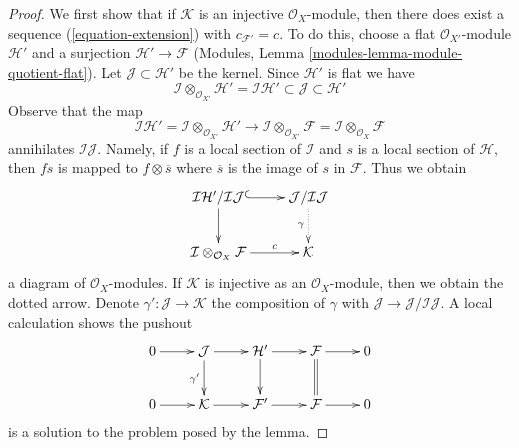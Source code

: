 \documentclass{stacks-project}
\theoremstyle{plain}
\theoremstyle{definition}
\theoremstyle{remark}
\numberwithin{equation}{subsection}
\begin{document}
\begin{proof}
We first show that if $\mathcal{K}$ is an injective $\mathcal{O}_X$-module,
then there does exist a sequence (\ref{equation-extension}) with
$c_{\mathcal{F}'} = c$. To do this, choose a flat
$\mathcal{O}_{X'}$-module $\mathcal{H}'$ and a surjection
$\mathcal{H}' \to \mathcal{F}$
(Modules, Lemma \ref{modules-lemma-module-quotient-flat}).
Let $\mathcal{J} \subset \mathcal{H}'$ be the kernel. Since $\mathcal{H}'$
is flat we have
$$
\mathcal{I} \otimes_{\mathcal{O}_{X'}} \mathcal{H}' =
\mathcal{I}\mathcal{H}'
\subset \mathcal{J} \subset \mathcal{H}'
$$
Observe that the map
$$
\mathcal{I}\mathcal{H}' =
\mathcal{I} \otimes_{\mathcal{O}_{X'}} \mathcal{H}'
\longrightarrow
\mathcal{I} \otimes_{\mathcal{O}_{X'}} \mathcal{F} =
\mathcal{I} \otimes_{\mathcal{O}_X} \mathcal{F}
$$
annihilates $\mathcal{I}\mathcal{J}$. Namely, if $f$ is a local section
of $\mathcal{I}$ and $s$ is a local section of $\mathcal{H}$, then
$fs$ is mapped to $f \otimes \overline{s}$ where $\overline{s}$ is
the image of $s$ in $\mathcal{F}$. Thus we obtain
$$
\xymatrix{
\mathcal{I}\mathcal{H}'/\mathcal{I}\mathcal{J}
\ar@{^{(}->}[r] \ar[d] &
\mathcal{J}/\mathcal{I}\mathcal{J} \ar@{..>}[d]_\gamma \\
\mathcal{I} \otimes_{\mathcal{O}_X} \mathcal{F} \ar[r]^-c &
\mathcal{K}
}
$$
a diagram of $\mathcal{O}_X$-modules. If $\mathcal{K}$ is injective
as an $\mathcal{O}_X$-module, then we obtain the dotted arrow.
Denote $\gamma' : \mathcal{J} \to \mathcal{K}$ the composition
of $\gamma$ with $\mathcal{J} \to \mathcal{J}/\mathcal{I}\mathcal{J}$.
A local calculation shows the pushout
$$
\xymatrix{
0 \ar[r] &
\mathcal{J} \ar[r] \ar[d]_{\gamma'} &
\mathcal{H}' \ar[r] \ar[d] &
\mathcal{F} \ar[r] \ar@{=}[d] &
0 \\
0 \ar[r] &
\mathcal{K} \ar[r] &
\mathcal{F}' \ar[r] &
\mathcal{F} \ar[r] &
0
}
$$
is a solution to the problem posed by the lemma.


\end{proof}
\end{document}
